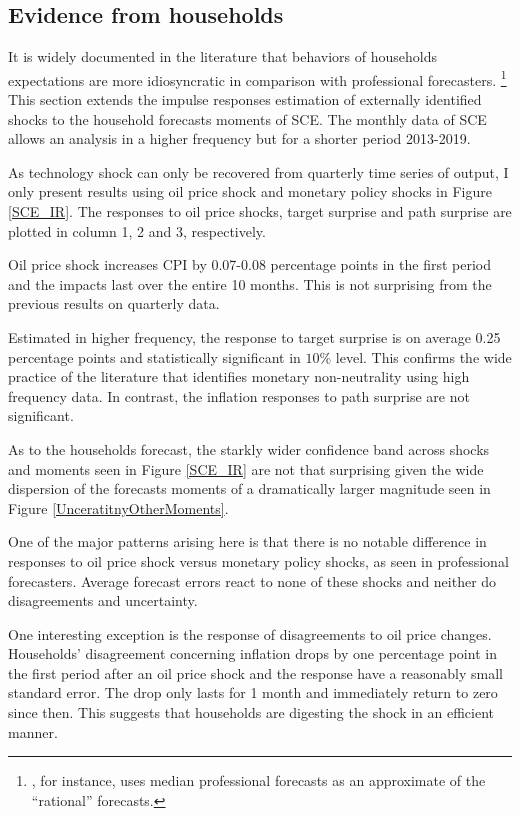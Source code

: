 \documentclass[12pt]{article}
\begin{document}
	\subsection{Evidence from households}
	
	It is widely documented in the literature that behaviors of households expectations are more idiosyncratic in comparison with professional forecasters. \footnote{\cite{carroll2003macroeconomic}, for instance, uses median professional forecasts as an approximate of the ``rational'' forecasts.} This section extends the impulse responses estimation of externally identified shocks to the household forecasts moments of SCE.  The monthly data of SCE allows an analysis in a higher frequency but for a shorter period 2013-2019. 
	
	As technology shock can only be recovered from quarterly time series of output, I only present results using oil price shock and monetary policy shocks in Figure \ref{SCE_IR}. The responses to oil price shocks, target surprise and path surprise are plotted in column 1, 2 and 3, respectively. 
	
	Oil price shock increases CPI by 0.07-0.08 percentage points in the first period and the impacts last over the entire 10 months. This is not surprising from the previous results on quarterly data. 
	
	Estimated in higher frequency, the response to target surprise is on average 0.25 percentage points and statistically significant in $10\%$ level. This confirms the wide practice of the literature that identifies monetary non-neutrality using high frequency data. In contrast, the inflation responses to path surprise are not significant. 
	
	As to the households forecast, the starkly wider confidence band across  shocks and moments seen in Figure \ref{SCE_IR} are not that surprising given the wide dispersion of the forecasts moments of a dramatically larger magnitude seen in Figure \ref{UnceratitnyOtherMoments}.  
	
	One of the major patterns arising here is that there is no notable difference in responses to oil price shock versus monetary policy shocks, as seen in professional forecasters.  Average forecast errors react to none of these shocks and neither do disagreements and uncertainty.  
	
	One interesting exception is the response of disagreements to oil price changes. Households' disagreement concerning inflation drops by one percentage point in the first period after an oil price shock and the response have a reasonably small standard error. The drop only lasts for 1 month and immediately return to zero since then. This suggests that households are digesting the shock in an efficient manner.  
	
\end{document}
